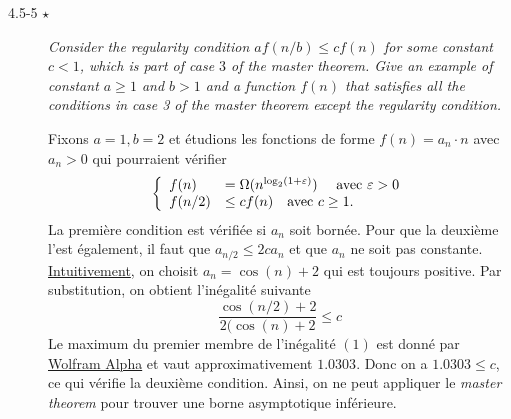 \begin{description}
  \item[4.5-5 $\star$] {\itshape Consider the regularity condition $af(n/b) \le cf(n)$ for some constant $c < 1$, which is part of case $3$ of the master theorem. Give an example of constant $a\ge 1$ and $b>1$ and a function $f(n)$ that satisfies all the conditions in case 3 of the master theorem except the regularity condition.}
    \begin{ex}
      Fixons $a = 1, b = 2$ et étudions les fonctions de forme $f(n) = a_n\cdot n$ avec $a_n>0$ qui pourraient vérifier 
      \[\left\{  
          \begin{array}{ll}
            f(n) &= \Omega(n^{\log_2 (1+\varepsilon)}) \quad\textrm{ avec }\varepsilon > 0\\
            f(n/2) &\le cf(n) \quad\textrm{avec } c\ge 1.
          \end{array}
      \right.\]
      La première condition est vérifiée si $a_n$ soit bornée. Pour que la deuxième l'est également, il faut que $a_{n/2} \le 2ca_n$ et que $a_n$ ne soit pas constante. \ul{Intuitivement}, on choisit $a_n = \cos(n)+2$ qui est toujours positive. Par substitution, on obtient l'inégalité suivante \[\frac{\cos(n/2)+2}{2(\cos(n)+2} \le c \tag{1}\] Le maximum du premier membre de l'inégalité $(1)$ est donné par \href{https://www.wolframalpha.com/input/?i=max+(cos(n%2F2)%2B2)%2F(2(cos(n)%2B2)}{Wolfram Alpha} 
et vaut approximativement $1.0303$. Donc on a $1.0303 \le c$, ce qui vérifie la deuxième condition. Ainsi, on ne peut appliquer le {\it master theorem} pour trouver une borne asymptotique inférieure.
    \end{ex}
\end{description}



